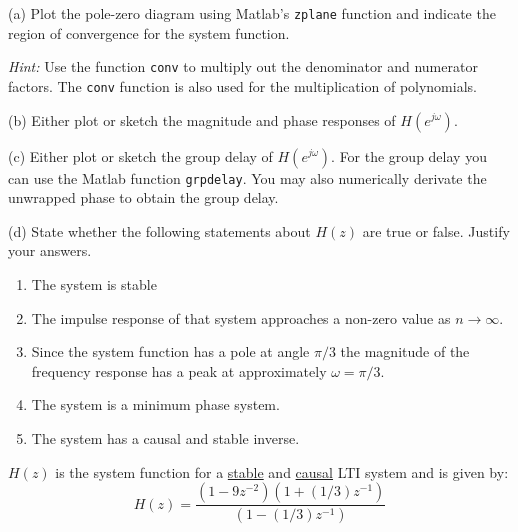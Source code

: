 \documentclass[12pt]{report}
\begin{document}
\begin{description}
	\item{(a)} Plot the pole-zero diagram using Matlab's \texttt{zplane} function and indicate the region of convergence for the system function. 
	
	\textit{Hint:} Use the function \texttt{conv} to multiply out the denominator and numerator factors. The \texttt{conv} function is also used for the multiplication of polynomials.
	
	\item{(b)} Either plot or sketch the magnitude and phase responses of $H(e^{j\omega})$.
	
	\item{(c)} Either plot or sketch the group delay of $H(e^{j\omega})$. For the group delay you can use the Matlab function \texttt{grpdelay}. You may also numerically derivate the unwrapped phase to obtain the group delay.
	
	\item{(d)} State whether the following statements about $H(z)$ are true or false. Justify your answers. 
	\begin{enumerate}
		\item The system is stable
		\item The impulse response of that system approaches a non-zero value as $n\to\infty$.
		\item Since the system function has a pole at angle $\pi/3$ the magnitude of the frequency response has a peak at approximately $\omega=\pi/3$.
		\item The system is a minimum phase system.
		\item The system has a causal and stable inverse.
	\end{enumerate}
\end{description}


$H(z)$ is the system function for a \underline{stable} and \underline{causal} LTI system and is given by:
\begin{equation}
H(z) = \frac{(1-9z^{-2})(1+(1/3)z^{-1})}{(1-(1/3)z^{-1})}
\end{equation}
\end{document}
